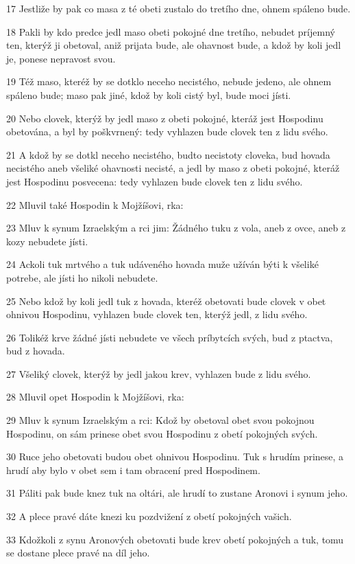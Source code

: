 \par 17 Jestliže by pak co masa z té obeti zustalo do tretího dne, ohnem spáleno bude.
\par 18 Pakli by kdo predce jedl maso obeti pokojné dne tretího, nebudet príjemný ten, kterýž ji obetoval, aniž prijata bude, ale ohavnost bude, a kdož by koli jedl je, ponese nepravost svou.
\par 19 Též maso, kteréž by se dotklo neceho necistého, nebude jedeno, ale ohnem spáleno bude; maso pak jiné, kdož by koli cistý byl, bude moci jísti.
\par 20 Nebo clovek, kterýž by jedl maso z obeti pokojné, kteráž jest Hospodinu obetována, a byl by poškvrnený: tedy vyhlazen bude clovek ten z lidu svého.
\par 21 A kdož by se dotkl neceho necistého, budto necistoty cloveka, bud hovada necistého aneb všeliké ohavnosti necisté, a jedl by maso z obeti pokojné, kteráž jest Hospodinu posvecena: tedy vyhlazen bude clovek ten z lidu svého.
\par 22 Mluvil také Hospodin k Mojžíšovi, rka:
\par 23 Mluv k synum Izraelským a rci jim: Žádného tuku z vola, aneb z ovce, aneb z kozy nebudete jísti.
\par 24 Ackoli tuk mrtvého a tuk udáveného hovada muže užíván býti k všeliké potrebe, ale jísti ho nikoli nebudete.
\par 25 Nebo kdož by koli jedl tuk z hovada, kteréž obetovati bude clovek v obet ohnivou Hospodinu, vyhlazen bude clovek ten, kterýž jedl, z lidu svého.
\par 26 Tolikéž krve žádné jísti nebudete ve všech príbytcích svých, bud z ptactva, bud z hovada.
\par 27 Všeliký clovek, kterýž by jedl jakou krev, vyhlazen bude z lidu svého.
\par 28 Mluvil opet Hospodin k Mojžíšovi, rka:
\par 29 Mluv k synum Izraelským a rci: Kdož by obetoval obet svou pokojnou Hospodinu, on sám prinese obet svou Hospodinu z obetí pokojných svých.
\par 30 Ruce jeho obetovati budou obet ohnivou Hospodinu. Tuk s hrudím prinese, a hrudí aby bylo v obet sem i tam obracení pred Hospodinem.
\par 31 Páliti pak bude knez tuk na oltári, ale hrudí to zustane Aronovi i synum jeho.
\par 32 A plece pravé dáte knezi ku pozdvižení z obetí pokojných vašich.
\par 33 Kdožkoli z synu Aronových obetovati bude krev obetí pokojných a tuk, tomu se dostane plece pravé na díl jeho.
